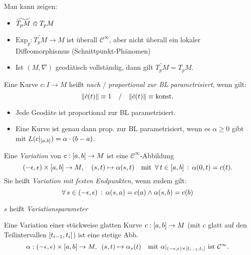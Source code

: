 \documentclass{cheat-sheet}
\newcommand{\Exp}{\mathrm{Exp}} %
\newcommand{\vinterval}{\ointerval{-\epsilon}{\epsilon}} %
\newcommand{\abinterval}{\cinterval{a}{b}} %
\begin{document}
\begin{bem}
  Man kann zeigen:
  \begin{itemize}
    \item $\widetilde{T_p M} \opn T_p M$
    \item $\Exp_p : \widetilde{T_p M} \to M$ ist überall $\mathcal{C}^\infty$, aber nicht überall ein lokaler Diffeomorphismus (Schnittpunkt-Phänomen)
    \item Ist $(M, \nabla)$ geodätisch vollständig, dann gilt $\widetilde{T_p M} = T_p M$.
  \end{itemize}
\end{bem}



\begin{defn}
  Eine Kurve $c : I \to M$ heißt \emph{nach} / \emph{proportional zur BL parametrisiert}, wenn gilt:
  \[
    \lVert\dot{c}(t)\rVert \equiv 1
    \quad / \quad
    \lVert\dot{c}(t)\rVert \equiv \text{konst}.
  \]
\end{defn}

\begin{bem}
  \begin{itemize}
    \item Jede Geodäte ist proportional zur BL parametrisiert.
    \item Eine Kurve ist genau dann prop. zur BL parametrisiert, wenn es $\alpha \geq 0$ gibt mit $L(c|_{\abinterval}) = \alpha \cdot (b - a)$.
  \end{itemize}
\end{bem}

\begin{defn}
  Eine \emph{Variation} von $c : \abinterval \to M$ ist eine $\mathcal{C}^\infty$-Abbildung
  \[
    \vinterval \times \abinterval \to M, \quad
    (s, t) \mapsto \alpha(s, t)
    \quad \text{mit} \enspace
    \fa{t \in \abinterval} \alpha(0, t) = c(t).
  \]
  Sie heißt \emph{Variation mit festen Endpunkten}, wenn zudem gilt:
  \[
    \forall \, {s \in \left( -\epsilon, \epsilon \right)} \,:\,
    \alpha(s, a) = c(a) \wedge \alpha(s, b) = c(b)
  \]
\end{defn}

\begin{sprech}
  $s$ heißt \emph{Variationsparameter}
\end{sprech}

\begin{defn}
  Eine Variation einer stückweise glatten Kurve $c : \abinterval \to M$ (mit $c$ glatt auf den Teilintervallen $\left[ t_{i-1}, t_i \right]$) ist eine stetige Abb.
  \[
    \alpha : \vinterval \times \abinterval \to M,
    \enspace (s, t) \mapsto \alpha_s(t)
    \quad \text{mit }
    \alpha|_{\vinterval \times \cinterval{t_{i-1}}{t_i}} \text{ ist } \mathcal{C}^\infty.
  \]
\end{defn}
\end{document}
